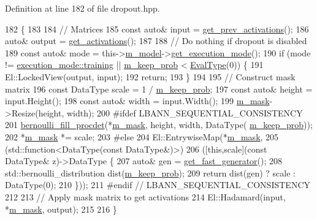 Definition at line 182 of file dropout.\+hpp.


\begin{DoxyCode}
182                         \{
183 
184     \textcolor{comment}{// Matrices}
185     \textcolor{keyword}{const} \textcolor{keyword}{auto}& input = \hyperlink{classlbann_1_1Layer_a45853df73a2e72bfaa774665a0f37ed7}{get\_prev\_activations}();
186     \textcolor{keyword}{auto}& output = \hyperlink{classlbann_1_1Layer_a1134b1a4385af199d7272c5aa827fa99}{get\_activations}();
187 
188     \textcolor{comment}{// Do nothing if dropout is disabled}
189     \textcolor{keyword}{const} \textcolor{keyword}{auto}& mode = this->\hyperlink{classlbann_1_1Layer_a3d9315e99574166f2f33e37b572021d2}{m\_model}->\hyperlink{classlbann_1_1model_addb40597cf29aa6d31b6a7d09ef48608}{get\_execution\_mode}();
190     \textcolor{keywordflow}{if} (mode != \hyperlink{base_8hpp_a2781a159088df64ed7d47cc91c4dc0a8ac185ddac8b5a8f5aa23c5b80bc12d214}{execution\_mode::training} || \hyperlink{classlbann_1_1dropout_aa06cbee70f3426b589990889b8ac8872}{m\_keep\_prob} < 
      \hyperlink{base_8hpp_a3266f5ac18504bbadea983c109566867}{EvalType}(0)) \{
191       El::LockedView(output, input);
192       \textcolor{keywordflow}{return};
193     \}
194 
195     \textcolor{comment}{// Construct mask matrix}
196     \textcolor{keyword}{const} DataType scale = 1 / \hyperlink{classlbann_1_1dropout_aa06cbee70f3426b589990889b8ac8872}{m\_keep\_prob};
197     \textcolor{keyword}{const} \textcolor{keyword}{auto}& height = input.Height();
198     \textcolor{keyword}{const} \textcolor{keyword}{auto}& width = input.Width();
199     \hyperlink{classlbann_1_1dropout_ad7d359957d41adcb64e6e3a2d4ad278d}{m\_mask}->Resize(height, width);
200 \textcolor{preprocessor}{#ifdef LBANN\_SEQUENTIAL\_CONSISTENCY}
201     \hyperlink{namespacelbann_ad1e3fe84cfa5257be476de3be805064d}{bernoulli\_fill\_procdet}(*\hyperlink{classlbann_1_1dropout_ad7d359957d41adcb64e6e3a2d4ad278d}{m\_mask}, height, width, DataType(
      \hyperlink{classlbann_1_1dropout_aa06cbee70f3426b589990889b8ac8872}{m\_keep\_prob}));
202     *\hyperlink{classlbann_1_1dropout_ad7d359957d41adcb64e6e3a2d4ad278d}{m\_mask} *= scale;
203 \textcolor{preprocessor}{#else}
204     El::EntrywiseMap(*\hyperlink{classlbann_1_1dropout_ad7d359957d41adcb64e6e3a2d4ad278d}{m\_mask},
205                      (std::function<DataType(\textcolor{keyword}{const} DataType&)>)
206                      ([\textcolor{keyword}{this},scale](\textcolor{keyword}{const} DataType& z)->DataType \{
207                        \textcolor{keyword}{auto}& gen = \hyperlink{namespacelbann_ae6ce9c2fdec6f81803f6b1a6555c31c5}{get\_fast\_generator}();
208                        std::bernoulli\_distribution dist(\hyperlink{classlbann_1_1dropout_aa06cbee70f3426b589990889b8ac8872}{m\_keep\_prob});
209                        \textcolor{keywordflow}{return} dist(gen) ? scale : DataType(0);
210                      \}));
211 \textcolor{preprocessor}{#endif // LBANN\_SEQUENTIAL\_CONSISTENCY}
212 
213     \textcolor{comment}{// Apply mask matrix to get activations}
214     El::Hadamard(input, *\hyperlink{classlbann_1_1dropout_ad7d359957d41adcb64e6e3a2d4ad278d}{m\_mask}, output);
215 
216   \}
\end{DoxyCode}
